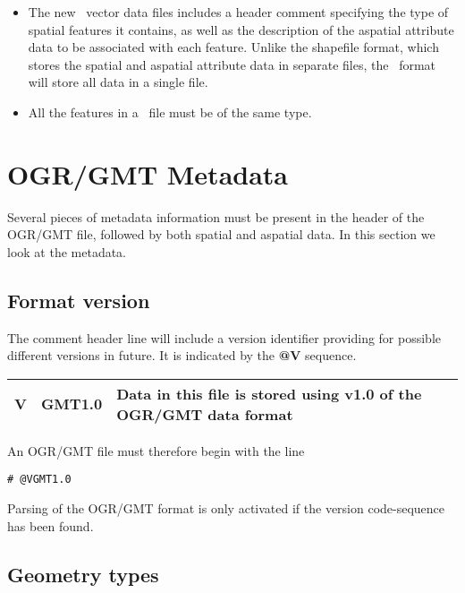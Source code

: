 \begin{itemize}
\item The new \GMT\ vector data files includes a header comment specifying
the type of spatial features it contains, as well as the description of
the aspatial attribute data to be associated with each feature. Unlike
the shapefile format, which stores the spatial and aspatial attribute
data in separate files, the \GMT\ format will store all data in a single
file.

\item  All the features in a \GMT\ file must be of the same type.
\end{itemize}

\section{OGR/GMT Metadata}

Several pieces of metadata information must be present in the header of the OGR/GMT file,
followed by both spatial and aspatial data.  In this section we look at the metadata.

\subsection{Format version}

The comment header line will include a version identifier providing for
possible different versions in future.  It is indicated by the \textbf{@V} sequence.

\begin{table}[h]
\small
\centering
\begin{tabular}{|l|l|l|} \hline
V & GMT1.0 & Data in this file is stored using v1.0 of the OGR/GMT data format \\ \hline
\end{tabular}
\label{tbl:Q1}
\end{table} 
An OGR/GMT file must therefore begin with the line

\begin{verbatim}
# @VGMT1.0
\end{verbatim}
Parsing of the OGR/GMT format is only activated if the version code-sequence has been found.

\subsection{Geometry types}

